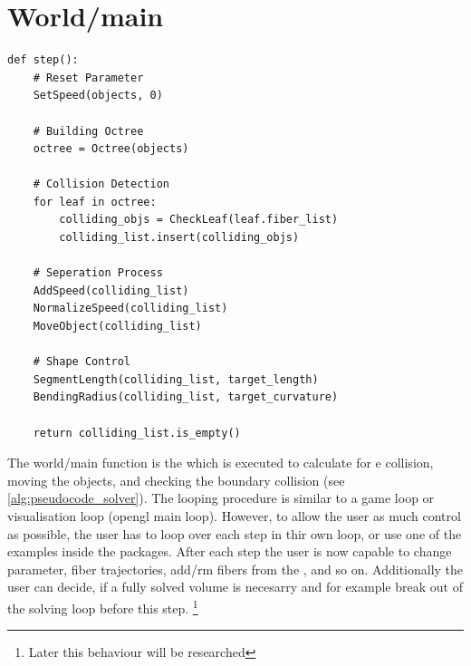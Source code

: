 \section{World/main}
% 
\begin{lstfloat}[!tb]
\lstset{style=python}
\begin{lstlisting}[]
def step():
    # Reset Parameter
    SetSpeed(objects, 0)
    
    # Building Octree
    octree = Octree(objects)
    
    # Collision Detection
    for leaf in octree:
        colliding_objs = CheckLeaf(leaf.fiber_list)
        colliding_list.insert(colliding_objs)
	
    # Seperation Process
    AddSpeed(colliding_list)
    NormalizeSpeed(colliding_list)
    MoveObject(colliding_list)
	
    # Shape Control
    SegmentLength(colliding_list, target_length)
    BendingRadius(colliding_list, target_curvature)

    return colliding_list.is_empty()
\end{lstlisting}
\caption{Pseudocode of the main algorithm: The function \texttt{FiberCollisionSolver} will loop the followings four steps, which are run in parallel, until no collision are detected anymore: 1. build an \texttt{octree} from all objects, 2. \texttt{Collision Detection}, 3. \texttt{Seperation Process} and 4. \texttt{Shape Control}.}
\label{alg:pseudocode_solver}
\end{lstfloat}
% 
The world/main function is the  which is executed to calculate for e collision, moving the objects, and checking the boundary collision (see \cref{alg:pseudocode_solver}).
The looping procedure is similar to a game loop or visualisation loop (\eg opengl main loop).
However, to allow the user as much control as possible, the user has to loop over each step in thir own loop, or use one of the examples inside the packages.
After each step the user is now capable to change parameter, fiber trajectories, add/rm fibers from the , and so on.
Additionally the user can decide, if a fully solved volume is necesarry and for example break out of the solving loop before this step. 
\footnote{Later this behaviour will be researched}
%
